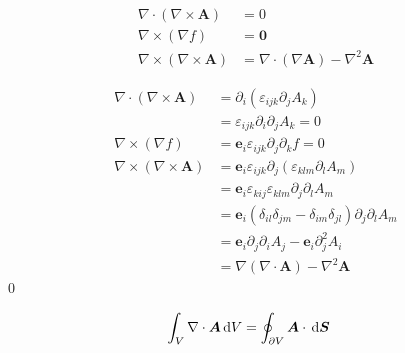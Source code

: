 \documentclass[uplatex,dvipdfmx,a4paper,11pt]{jlreq}
\makeatletter
\renewcommand{\AA}{\bm{A}}
\newcommand{\ee}{\bm{e}}
\newcommand{\grad}{\nabla}
\renewcommand{\div}{\nabla\cdot}
\newcommand{\rot}{\nabla\times}
\newcommand{\laplacian}{\nabla^2}
\theoremstyle{definition}
\renewenvironment{proof}[1][\proofname]{\par
  \normalfont
  \topsep6\p@\@plus6\p@ \trivlist
  \item[\hskip\labelsep{\bfseries #1}\@addpunct{\bfseries}]\ignorespaces\quad\par
}{%
  \qed\endtrivlist\@endpefalse
}
\renewcommand\proofname{証明}
\makeatother
\begin{document}
\begin{theorem}[有名定理]
  \begin{align}
    \div{(\rot{\bm{A}})} & = 0                                          \\
    \rot{(\grad{f})}     & = \bm{0}                                     \\
    \rot{(\rot{\bm{A}})} & = \div{(\grad{\bm{A}})} - \laplacian{\bm{A}}
  \end{align}
\end{theorem}
\begin{proof}
  \begin{align}
    \div{(\rot{\bm{A}})} & = \partial_i(\varepsilon_{ijk}\partial_jA_k)                                    \\
                         & = \varepsilon_{ijk}\partial_i\partial_jA_k = 0                                  \\
    \rot{(\grad{f})}     & = \ee_i\varepsilon_{ijk}\partial_j\partial_kf = 0                               \\
    \rot{(\rot{\bm{A}})} & = \ee_i\varepsilon_{ijk}\partial_j(\varepsilon_{klm}\partial_lA_m)              \\
                         & = \ee_i\varepsilon_{kij}\varepsilon_{klm}\partial_j\partial_lA_m                \\
                         & = \ee_i(\delta_{il}\delta_{jm} - \delta_{im}\delta_{jl})\partial_j\partial_lA_m \\
                         & = \ee_i\partial_j\partial_iA_j - \ee_i\partial_j^2A_i                           \\
                         & = \grad{(\div{\bm{A}})} - \laplacian{\bm{A}}
  \end{align}
\end{proof}

\begin{theorem}
  \begin{align}
    \int_V\div{\AA}\dl{V} & = \oint_{\partial V}\AA\cdot\dl{\bm{S}}
  \end{align}
\end{theorem}
\end{document}
